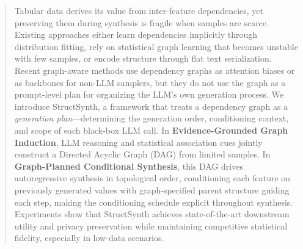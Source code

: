 \begin{abstract}
Tabular data derives its value from inter-feature dependencies, yet preserving them during synthesis is fragile when samples are scarce. Existing approaches either learn dependencies implicitly through distribution fitting, rely on statistical graph learning that becomes unstable with few samples, or encode structure through flat text serialization. Recent graph-aware methods use dependency graphs as attention biases or as backbones for non-LLM samplers, but they do not use the graph as a prompt-level plan for organizing the LLM's own generation process. We introduce \textsf{StructSynth}, a framework that treats a dependency graph as a \textit{generation plan}---determining the generation order, conditioning context, and scope of each black-box LLM call. In \textbf{Evidence-Grounded Graph Induction}, LLM reasoning and statistical association cues jointly construct a Directed Acyclic Graph (DAG) from limited samples. In \textbf{Graph-Planned Conditional Synthesis}, this DAG drives autoregressive synthesis in topological order, conditioning each feature on previously generated values with graph-specified parent structure guiding each step, making the conditioning schedule explicit throughout synthesis. Experiments show that \textsf{StructSynth} achieves state-of-the-art downstream utility and privacy preservation while maintaining competitive statistical fidelity, especially in low-data scenarios.
\end{abstract}
